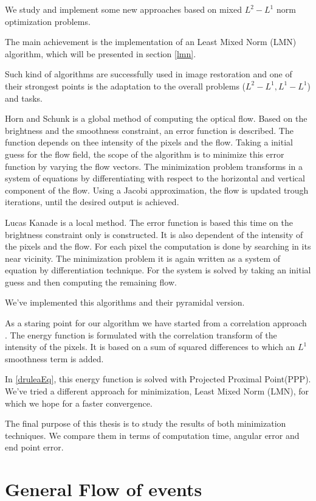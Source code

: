 \documentclass[12pt,a4paper,twoside]{report}
\begin{document}
We study and implement some new approaches based on mixed $L^2-L^1$ norm optimization problems. 

The main achievement is the implementation of an Least Mixed Norm (LMN) algorithm, which will be presented in section \ref{lmn}.

Such kind of algorithms are successfully used in image restoration and one of their strongest points is the adaptation to the overall problems ($L^2-L^1, L^1-L^1$) and tasks.

Horn and Schunk is a global method of computing the optical flow. Based on the brightness and the smoothness constraint, an error function is described. The function depends on thee intensity of the pixels and the flow. Taking a initial guess for the flow field, the scope of the algorithm is to minimize this error function by varying the flow vectors. The minimization problem transforms in a system of equations by differentiating with respect to the horizontal and vertical component of the flow. Using a Jacobi approximation, the flow is updated trough iterations, until the desired output is achieved.

Lucas Kanade is a local method. The error function is based this time on the brightness constraint only is constructed. It is also dependent of the intensity of the pixels and the flow. For each pixel the computation is done by searching in its near vicinity. The minimization problem it is again written as a system of equation by differentiation technique. For the system is solved by taking an initial guess and then computing the remaining flow.

We've implemented this algorithms and their pyramidal version.

As a staring point for our algorithm we have started from a correlation approach \cite{drulea2013}. The energy function is formulated with the correlation transform of the intensity of the pixels. It is based on a sum of squared differences to which an $L^1$ smoothness term is added. 

In \ref{druleaEq}, this energy function is solved with Projected Proximal Point(PPP). We've tried a different approach for minimization, Least Mixed Norm (LMN), for which we hope for a faster convergence. 

The final purpose of this thesis is to study the results of both minimization techniques. We compare them in terms of computation time, angular error and end point error.   

\section{General Flow of events}
\end{document}
